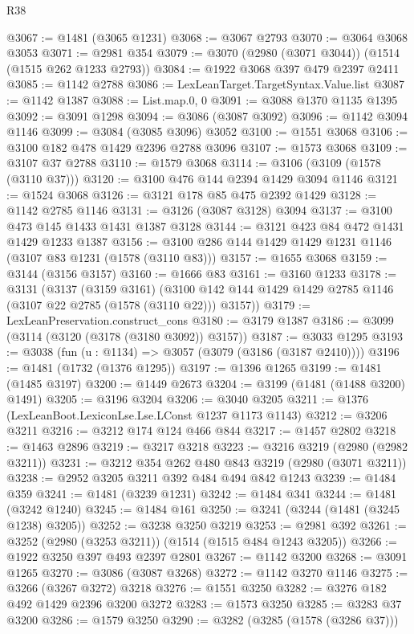 \begin{lexlean}{R38}
\begin{coremodule}
@3067 := @1481 (@3065 @1231)
@3068 := @3067 @2793
@3070 := @3064 @3068 @3053
@3071 := @2981 @354
@3079 := @3070 (@2980 (@3071 @3044)) (@1514 (@1515 @262 @1233 @2793))
@3084 := @1922 @3068 @397 @479 @2397 @2411
@3085 := @1142 @2788
@3086 := LexLeanTarget.TargetSyntax.Value.list
@3087 := @1142 @1387
@3088 := List.map.{0, 0}
@3091 := @3088 @1370 @1135 @1395
@3092 := @3091 @1298
@3094 := @3086 (@3087 @3092)
@3096 := @1142 @3094 @1146
@3099 := @3084 (@3085 @3096) @3052
@3100 := @1551 @3068
@3106 := @3100 @182 @478 @1429 @2396 @2788 @3096
@3107 := @1573 @3068
@3109 := @3107 @37 @2788
@3110 := @1579 @3068
@3114 := @3106 (@3109 (@1578 (@3110 @37)))
@3120 := @3100 @476 @144 @2394 @1429 @3094 @1146
@3121 := @1524 @3068
@3126 := @3121 @178 @85 @475 @2392 @1429
@3128 := @1142 @2785 @1146
@3131 := @3126 (@3087 @3128) @3094
@3137 := @3100 @473 @145 @1433 @1431 @1387 @3128
@3144 := @3121 @423 @84 @472 @1431 @1429 @1233 @1387
@3156 := @3100 @286 @144 @1429 @1429 @1231 @1146 (@3107 @83 @1231 (@1578 (@3110 @83)))
@3157 := @1655 @3068
@3159 := @3144 (@3156 @3157)
@3160 := @1666 @83
@3161 := @3160 @1233
@3178 := @3131
    (@3137
      (@3159 @3161)
      (@3100 @142 @144 @1429 @1429 @2785 @1146 (@3107 @22 @2785 (@1578 (@3110 @22))) @3157))
@3179 := LexLeanPreservation.construct_cons
@3180 := @3179 @1387
@3186 := @3099 (@3114 (@3120 (@3178 (@3180 @3092)) @3157))
@3187 := @3033 @1295
@3193 := @3038 (fun (u : @1134) => @3057 (@3079 (@3186 (@3187 @2410))))
@3196 := @1481 (@1732 (@1376 @1295))
@3197 := @1396 @1265
@3199 := @1481 (@1485 @3197)
@3200 := @1449 @2673
@3204 := @3199 (@1481 (@1488 @3200) @1491)
@3205 := @3196 @3204
@3206 := @3040 @3205
@3211 := @1376 (LexLeanBoot.LexiconLse.Lse.LConst @1237 @1173 @1143)
@3212 := @3206 @3211
@3216 := @3212 @174 @124 @466 @844
@3217 := @1457 @2802
@3218 := @1463 @2896
@3219 := @3217 @3218
@3223 := @3216 @3219 (@2980 (@2982 @3211))
@3231 := @3212 @354 @262 @480 @843 @3219 (@2980 (@3071 @3211))
@3238 := @2952 @3205 @3211 @392 @484 @494 @842 @1243
@3239 := @1484 @359
@3241 := @1481 (@3239 @1231)
@3242 := @1484 @341
@3244 := @1481 (@3242 @1240)
@3245 := @1484 @161
@3250 := @3241 (@3244 (@1481 (@3245 @1238) @3205))
@3252 := @3238 @3250 @3219
@3253 := @2981 @392
@3261 := @3252 (@2980 (@3253 @3211)) (@1514 (@1515 @484 @1243 @3205))
@3266 := @1922 @3250 @397 @493 @2397 @2801
@3267 := @1142 @3200
@3268 := @3091 @1265
@3270 := @3086 (@3087 @3268)
@3272 := @1142 @3270 @1146
@3275 := @3266 (@3267 @3272) @3218
@3276 := @1551 @3250
@3282 := @3276 @182 @492 @1429 @2396 @3200 @3272
@3283 := @1573 @3250
@3285 := @3283 @37 @3200
@3286 := @1579 @3250
@3290 := @3282 (@3285 (@1578 (@3286 @37)))

\end{coremodule}
\end{lexlean}
